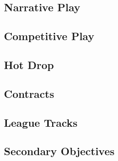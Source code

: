 

\subsection{Narrative Play}



\subsection{Competitive Play}



\newpage

\subsection{Hot Drop}



\newpage

\subsection{Contracts}



\subsection{League Tracks}



\subsection{Secondary Objectives}


